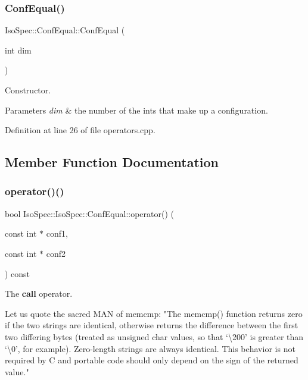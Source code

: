 \subsubsection{\texorpdfstring{Conf\+Equal()}{ConfEqual()}}
{\footnotesize\ttfamily Iso\+Spec\+::\+Conf\+Equal\+::\+Conf\+Equal (\begin{DoxyParamCaption}\item[{int}]{dim }\end{DoxyParamCaption})}



Constructor. 


\begin{DoxyParams}{Parameters}
{\em dim} & the number of the ints that make up a configuration. \\
\hline
\end{DoxyParams}


Definition at line 26 of file operators.\+cpp.



\subsection{Member Function Documentation}
\mbox{\label{class_iso_spec_1_1_iso_spec_1_1_conf_equal_ad9d7fb4a033b947a983b302cb3e0c735}} 
\subsubsection{\texorpdfstring{operator()()}{operator()()}}
{\footnotesize\ttfamily bool Iso\+Spec\+::\+Iso\+Spec\+::\+Conf\+Equal\+::operator() (\begin{DoxyParamCaption}\item[{const int $\ast$}]{conf1,  }\item[{const int $\ast$}]{conf2 }\end{DoxyParamCaption}) const\hspace{0.3cm}{\ttfamily [inline]}}



The {\bfseries call} operator. 

Let us quote the sacred M\+AN of memcmp\+: "The memcmp() function returns zero if the two strings are identical, otherwise returns the difference between the first two differing bytes (treated as unsigned char values, so that `\textbackslash{}200' is greater than `\textbackslash{}0', for example). Zero-\/length strings are always identical. This behavior is not required by C and portable code should only depend on the sign of the returned value."


